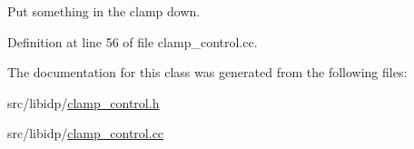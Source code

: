 Put something in the clamp down. 



Definition at line 56 of file clamp\_\-control.cc.



The documentation for this class was generated from the following files:\begin{DoxyCompactItemize}
\item 
src/libidp/\hyperlink{clamp__control_8h}{clamp\_\-control.h}\item 
src/libidp/\hyperlink{clamp__control_8cc}{clamp\_\-control.cc}\end{DoxyCompactItemize}
